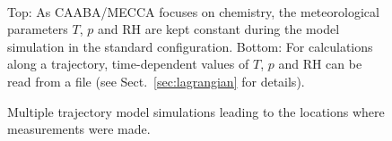 \documentclass[a4paper,twoside]{article}
\begin{document}
\begin{figure}%
  \begin{center}
    \\[3mm]
  \end{center}
  \caption{Top: As CAABA/MECCA focuses on chemistry, the meteorological
    parameters $T$, $p$ and RH are kept constant during the model
    simulation in the standard configuration. Bottom: For calculations
    along a trajectory, time-dependent values of $T$, $p$ and RH can be
    read from a file (see Sect.~\ref{sec:lagrangian} for details).}
  \label{fig:box_model}
\end{figure}

\begin{figure}%
  \begin{center}
  \end{center}
  \caption{Multiple trajectory model simulations leading to the
    locations where measurements were made.}
  \label{fig:traject}
\end{figure}
\end{document}
